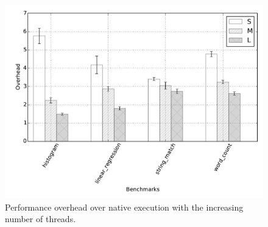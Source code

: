 
\begin{figure}[t]
\centering
\includegraphics[scale=0.45]{figure/benchmarks/worksize-times-inspector.pdf}
\caption{Performance overhead over native execution with the increasing number of threads.
}\label{fig:overheads}
\end{figure}
